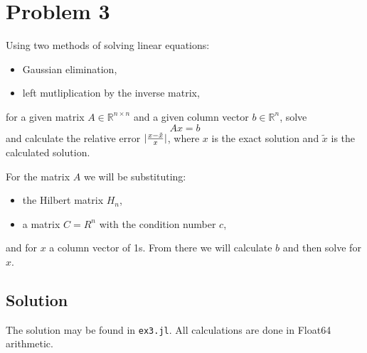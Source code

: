 \documentclass[a4paper, 12pt]{article}
\newcommand{\code}[1]{\texttt{#1}}
\newcommand{\R}{\mathbb{R}}
\DeclarePairedDelimiter\abs{\lvert}{\rvert}
\begin{document}
\section{Problem 3}
Using two methods of solving linear equations:
\begin{itemize}
\item Gaussian elimination,
\item left mutliplication by the inverse matrix,
\end{itemize}
for a given matrix $A \in \R^{n \times n}$ and a given column vector $b \in
\R^{n}$, solve
\begin{equation}
Ax = b
\end{equation}
and calculate the relative error $\abs{\frac{x - \tilde{x}}{x}}$, where $x$ is
the exact solution and $\tilde{x}$ is the calculated solution.

For the matrix $A$ we will be substituting:
\begin{itemize}
\item the Hilbert matrix $H_n$,
\item a matrix $C = R^n$ with the condition number $c$,
\end{itemize}
and for $x$ a column vector of 1s. From there we will calculate $b$ and then
solve for $x$.

\subsection{Solution}
The solution may be found in \code{ex3.jl}. All calculations are done in Float64
arithmetic.
\end{document}
